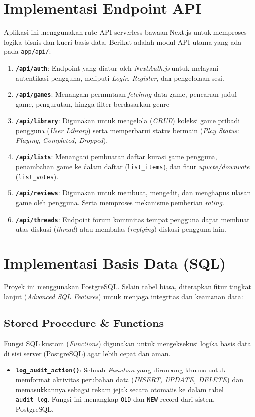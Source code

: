 \documentclass[12pt,a4paper]{article}
\begin{document}
\section{Implementasi Endpoint API}

Aplikasi ini menggunakan rute API serverless bawaan Next.js untuk memproses logika bisnis dan kueri basis data. Berikut adalah modul API utama yang ada pada \texttt{app/api/}:

\begin{enumerate}
    \item \textbf{\texttt{/api/auth}}: Endpoint yang diatur oleh \textit{NextAuth.js} untuk melayani autentikasi pengguna, meliputi \textit{Login}, \textit{Register}, dan pengelolaan sesi.
    \item \textbf{\texttt{/api/games}}: Menangani permintaan \textit{fetching} data game, pencarian judul game, pengurutan, hingga filter berdasarkan genre.
    \item \textbf{\texttt{/api/library}}: Digunakan untuk mengelola (\textit{CRUD}) koleksi game pribadi pengguna (\textit{User Library}) serta memperbarui status bermain (\textit{Play Status}: \textit{Playing, Completed, Dropped}).
    \item \textbf{\texttt{/api/lists}}: Menangani pembuatan daftar kurasi game pengguna, penambahan game ke dalam daftar (\texttt{list\_items}), dan fitur \textit{upvote/downvote} (\texttt{list\_votes}).
    \item \textbf{\texttt{/api/reviews}}: Digunakan untuk membuat, mengedit, dan menghapus ulasan game oleh pengguna. Serta memproses mekanisme pemberian \textit{rating}.
    \item \textbf{\texttt{/api/threads}}: Endpoint forum komunitas tempat pengguna dapat membuat utas diskusi (\textit{thread}) atau membalas (\textit{replying}) diskusi pengguna lain.
\end{enumerate}

\section{Implementasi Basis Data (SQL)}

Proyek ini menggunakan PostgreSQL. Selain tabel biasa, diterapkan fitur tingkat lanjut (\textit{Advanced SQL Features}) untuk menjaga integritas dan keamanan data:

\subsection{Stored Procedure \& Functions}
Fungsi SQL kustom (\textit{Functions}) digunakan untuk mengeksekusi logika basis data di sisi server (PostgreSQL) agar lebih cepat dan aman.
\begin{itemize}
    \item \textbf{\texttt{log\_audit\_action()}}: Sebuah \textit{Function} yang dirancang khusus untuk memformat aktivitas perubahan data (\textit{INSERT, UPDATE, DELETE}) dan memasukkannya sebagai rekam jejak secara otomatis ke dalam tabel \texttt{audit\_log}. Fungsi ini menangkap \texttt{OLD} dan \texttt{NEW} record dari sistem PostgreSQL.
\end{itemize}
\end{document}
